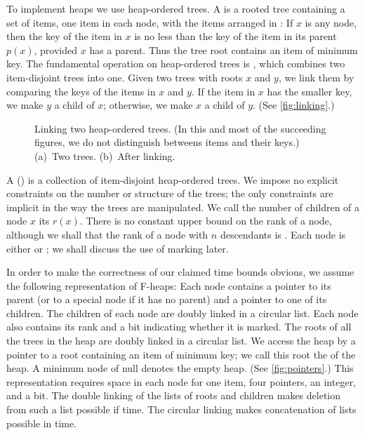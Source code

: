 To implement heaps we use heap-ordered trees. A  is a rooted
tree containing a set of items, one item in each node, with the items arranged in
: If \(x\) is any node, then the key of the item in \(x\) is no less
than the key of the item in its parent \(p(x)\), provided \(x\) has a parent. Thus
the tree root contains an item of minimum key. The fundamental operation on
heap-ordered trees is , which combines two item-disjoint trees into
one. Given two trees with roots \(x\) and \(y\), we link them by comparing the keys
of the items in \(x\) and \(y\). If the item in \(x\) has the smaller key, we make
\(y\) a child of \(x\); otherwise, we make \(x\) a child of \(y\). (See
\autoref{fig:linking}.)

\begin{figure}
    \begin{subfigure}[t]{0.50\textwidth}
        \centering
		
        \caption{}
    \end{subfigure}
    \begin{subfigure}[t]{0.49\textwidth}
        \centering
		
        \caption{}
    \end{subfigure}
    \caption{Linking two heap-ordered trees. (In this and most of the succeeding
        figures, we do not distinguish betweens items and their keys.) (a)~Two trees.
        (b)~After linking.}
    \label{fig:linking}
\end{figure}

A  () is a collection of item-disjoint heap-ordered
trees. We impose no explicit constraints on the number or structure of the trees; the
only constraints are implicit in the way the trees are manipulated. We call the
number of children of a node \(x\) its  \(r(x)\). There is no constant
upper bound on the rank of a node, although we shall that the rank of a node with
\(n\) descendants is . Each node is either  or
; we shall discuss the use of marking later.

In order to make the correctness of our claimed time bounds obvious, we assume the
following representation of F-heaps: Each node contains a pointer to its parent (or
to a special node  if it has no parent) and a pointer to one of its
children. The children of each node are doubly linked in a circular list. Each node
also contains its rank and a bit indicating whether it is marked. The roots of all
the trees in the heap are doubly linked in a circular list. We access the heap by
a pointer to a root containing an item of minimum key; we call this root the
 of the heap. A minimum node of null denotes the empty heap. (See
\autoref{fig:pointers}.) This representation requires space in each node for one
item, four pointers, an integer, and a bit. The double linking of the lists of roots
and children makes deletion from such a list possible if  time. The circular
linking makes concatenation of lists possible in  time.

